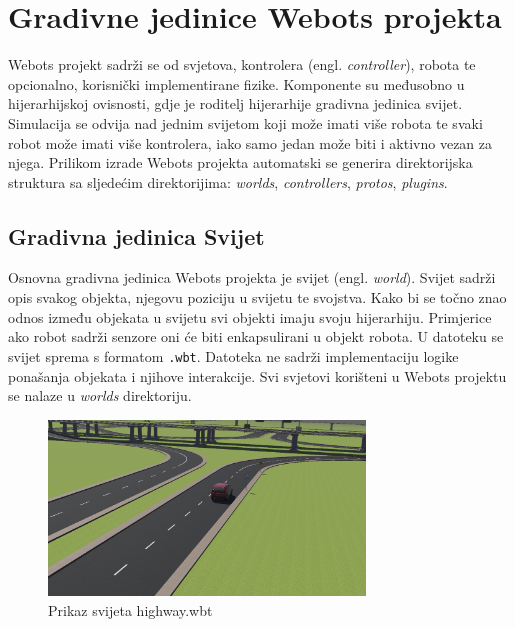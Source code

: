 \documentclass[times, utf8, zavrsni]{fer}
\begin{document}
\newpage
\section{Gradivne jedinice Webots projekta}
Webots projekt sadrži se od svjetova, kontrolera (engl. \textit{controller}), robota te opcionalno, korisnički implementirane fizike. Komponente su međusobno u hijerarhijskoj ovisnosti, gdje je roditelj hijerarhije gradivna jedinica svijet. Simulacija se odvija nad jednim svijetom koji može imati više robota te svaki robot može imati više kontrolera, iako samo jedan može biti i aktivno vezan za njega. Prilikom izrade Webots projekta automatski se generira direktorijska struktura sa sljedećim direktorijima: \textit{worlds}, \textit{controllers}, \textit{protos}, \textit{plugins}.

\subsection{Gradivna jedinica Svijet}
Osnovna gradivna jedinica Webots projekta je svijet (engl. \textit{world}). Svijet sadrži opis svakog objekta, njegovu poziciju u svijetu te svojstva. Kako bi se točno znao odnos između objekata u svijetu svi objekti imaju svoju hijerarhiju. Primjerice ako robot sadrži senzore oni će biti enkapsulirani u objekt robota. U datoteku se svijet sprema s formatom \texttt{.wbt}. Datoteka ne sadrži implementaciju logike ponašanja objekata i njihove interakcije. Svi svjetovi korišteni u Webots projektu se nalaze u \textit{worlds} direktoriju.


\begin{figure}[htb!]
\centering
\includegraphics[width=0.75\textwidth]{webot_highway_world.png}
\caption{Prikaz svijeta highway.wbt}
\label{fig:webots_highway}
\end{figure}
\end{document}
